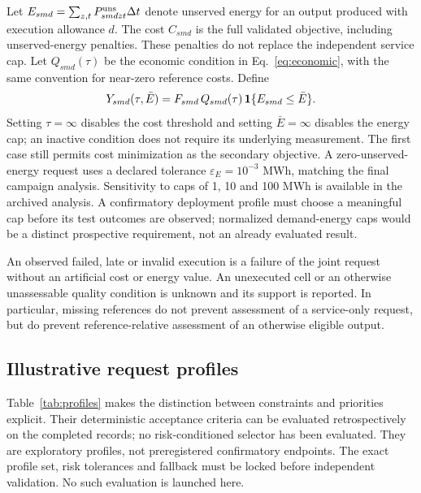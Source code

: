 Let $E_{smd}=\sum_{z,t}P^{\rm uns}_{smdzt}\Delta t$ denote unserved energy for
an output produced with execution allowance $d$. The cost $C_{smd}$ is the
full validated objective, including unserved-energy penalties. These
penalties do not replace the independent service cap. Let $Q_{smd}(\tau)$
be the economic condition in Eq.~\eqref{eq:economic}, with the same convention
for near-zero reference costs. Define
\begin{equation}
 Y_{smd}(\tau,\bar E)
 =F_{smd}\,Q_{smd}(\tau)\,\mathbf{1}\{E_{smd}\leq\bar E\}.
 \label{eq:joint_requirement}
\end{equation}
Setting $\tau=\infty$ disables the cost threshold and setting $\bar E=\infty$
disables the energy cap; an inactive condition does not require its underlying
measurement. The first case still permits cost minimization as the secondary
objective. A zero-unserved-energy request uses a declared tolerance
$\varepsilon_E=10^{-3}$ MWh, matching the final campaign analysis.
Sensitivity to caps of 1, 10 and 100 MWh is available in the archived analysis.
A confirmatory deployment profile must choose a meaningful cap before its
test outcomes are observed; normalized demand-energy caps would be a distinct
prospective requirement, not an already evaluated result.

An observed failed, late or invalid execution is a failure of the joint
request without an artificial cost or energy value. An unexecuted cell or an
otherwise unassessable quality condition is unknown and its support is
reported. In particular, missing references do not prevent assessment of
a service-only request, but do prevent reference-relative assessment of an
otherwise eligible output.

\subsection{Illustrative request profiles}
Table~\ref{tab:profiles} makes the distinction between constraints and priorities
explicit. Their deterministic acceptance criteria can be evaluated
retrospectively on the completed records; no risk-conditioned selector has
been evaluated. They are exploratory profiles, not preregistered confirmatory
endpoints. The exact profile set, risk tolerances and fallback must be locked
before independent validation. No such evaluation is launched here.

